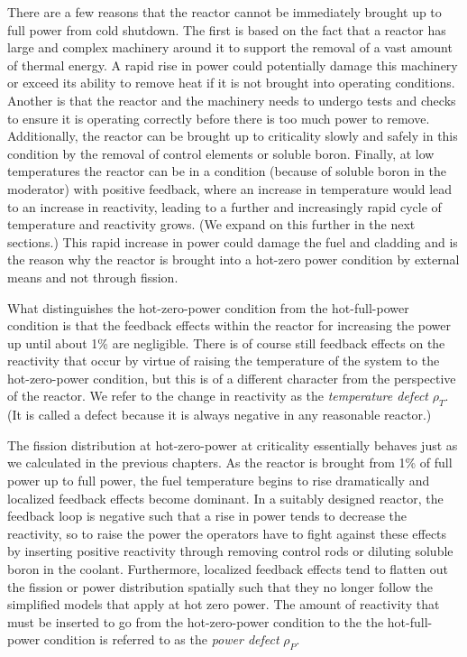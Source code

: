 There are a few reasons that the reactor cannot be immediately brought up to full power from cold shutdown. The first is based on the fact that a reactor has large and complex machinery around it to support the removal of a vast amount of thermal energy. A rapid rise in power could potentially damage this machinery or exceed its ability to remove heat if it is not brought into operating conditions. Another is that the reactor and the machinery needs to undergo tests and checks to ensure it is operating correctly before there is too much power to remove. Additionally, the reactor can be brought up to criticality slowly and safely in this condition by the removal of control elements or soluble boron. Finally, at low temperatures the reactor can be in a condition (because of soluble boron in the moderator) with positive feedback, where an increase in temperature would lead to an increase in reactivity, leading to a further and increasingly rapid cycle of temperature and reactivity grows. (We expand on this further in the next sections.) This rapid increase in power could damage the fuel and cladding and is the reason why the reactor is brought into a hot-zero power condition by external means and not through fission. 

What distinguishes the hot-zero-power condition from the hot-full-power condition is that the feedback effects within the reactor for increasing the power up until about 1\% are negligible. There is of course still feedback effects on the reactivity that occur by virtue of raising the temperature of the system to the hot-zero-power condition, but this is of a different character from the perspective of the reactor. We refer to the change in reactivity as the \emph{temperature defect} $\rho_T$. (It is called a defect because it is always negative in any reasonable reactor.)

The fission distribution at hot-zero-power at criticality essentially behaves just as we calculated in the previous chapters. As the reactor is brought from 1\% of full power up to full power, the fuel temperature begins to rise dramatically and localized feedback effects become dominant. In a suitably designed reactor, the feedback loop is negative such that a rise in power tends to decrease the reactivity, so to raise the power the operators have to fight against these effects by inserting positive reactivity through removing control rods or diluting soluble boron in the coolant. Furthermore, localized feedback effects tend to flatten out the fission or power distribution spatially such that they no longer follow the simplified models that apply at hot zero power. The amount of reactivity that must be inserted to go from the hot-zero-power condition to the the hot-full-power condition is referred to as the \emph{power defect} $\rho_P$.

